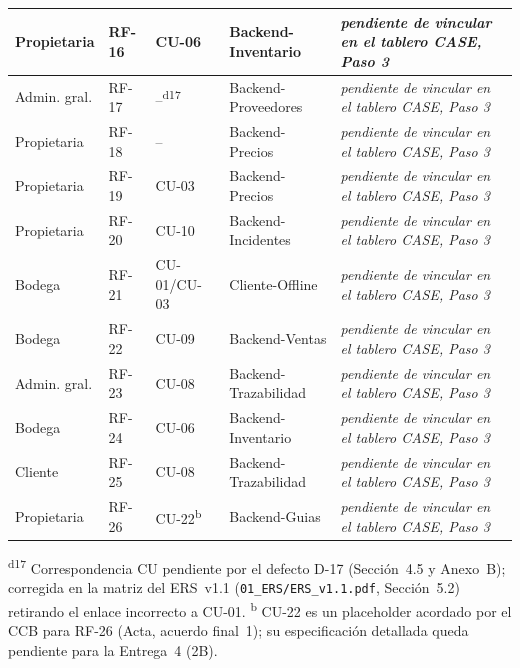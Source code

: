 \documentclass[11pt,a4paper]{article}
\begin{document}
\begin{longtable}{|p{2.6cm}|p{1.3cm}|p{2.3cm}|p{2.6cm}|p{2.9cm}|}
\hline
Propietaria & RF-16 & CU-06 & Backend-Inventario & \textit{pendiente de vincular en el tablero CASE, Paso 3} \\
\hline
Admin. gral. & RF-17 & --\textsuperscript{d17} & Backend-Proveedores & \textit{pendiente de vincular en el tablero CASE, Paso 3} \\
\hline
Propietaria & RF-18 & -- & Backend-Precios & \textit{pendiente de vincular en el tablero CASE, Paso 3} \\
\hline
Propietaria & RF-19 & CU-03 & Backend-Precios & \textit{pendiente de vincular en el tablero CASE, Paso 3} \\
\hline
Propietaria & RF-20 & CU-10 & Backend-Incidentes & \textit{pendiente de vincular en el tablero CASE, Paso 3} \\
\hline
Bodega & RF-21 & CU-01/CU-03 & Cliente-Offline & \textit{pendiente de vincular en el tablero CASE, Paso 3} \\
\hline
Bodega & RF-22 & CU-09 & Backend-Ventas & \textit{pendiente de vincular en el tablero CASE, Paso 3} \\
\hline
Admin. gral. & RF-23 & CU-08 & Backend-Trazabilidad & \textit{pendiente de vincular en el tablero CASE, Paso 3} \\
\hline
Bodega & RF-24 & CU-06 & Backend-Inventario & \textit{pendiente de vincular en el tablero CASE, Paso 3} \\
\hline
Cliente & RF-25 & CU-08 & Backend-Trazabilidad & \textit{pendiente de vincular en el tablero CASE, Paso 3} \\
\hline
Propietaria & RF-26 & CU-22\textsuperscript{b} & Backend-Guias & \textit{pendiente de vincular en el tablero CASE, Paso 3} \\
\hline
\end{longtable}

\footnotesize\textsuperscript{d17} Correspondencia CU pendiente por el defecto D-17 (Sección~4.5 y Anexo~B); corregida en la matriz del ERS~v1.1 (\texttt{01\_ERS/ERS\_v1.1.pdf}, Sección~5.2) retirando el enlace incorrecto a CU-01. \quad \textsuperscript{b} CU-22 es un placeholder acordado por el CCB para RF-26 (Acta, acuerdo final~1); su especificación detallada queda pendiente para la Entrega~4 (2B).\normalsize
\end{document}
